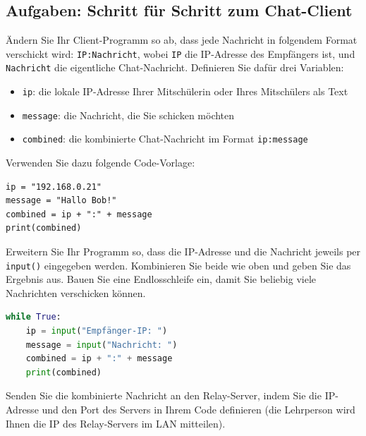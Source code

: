 \subsection{Aufgaben: Schritt für Schritt zum Chat-Client}

\begin{myexercise}
    Ändern Sie Ihr Client-Programm so ab, dass jede Nachricht in folgendem Format verschickt wird: \texttt{IP:Nachricht}, wobei \texttt{IP} die \gls{IP}-Adresse des Empfängers ist, und \texttt{Nachricht} die eigentliche Chat-Nachricht. Definieren Sie dafür drei Variablen:
    \begin{itemize}
        \item \texttt{ip}: die lokale \gls{IP}-Adresse Ihrer Mitschülerin oder Ihres Mitschülers als Text
        \item \texttt{message}: die Nachricht, die Sie schicken möchten
        \item \texttt{combined}: die kombinierte Chat-Nachricht im Format \texttt{ip:message}
    \end{itemize}
    Verwenden Sie dazu folgende Code-Vorlage:
    \begin{lstlisting}
ip = "192.168.0.21"
message = "Hallo Bob!"
combined = ip + ":" + message
print(combined)
\end{lstlisting}
\end{myexercise}

\begin{myexercise}

    Erweitern Sie Ihr Programm so, dass die \gls{IP}-Adresse und die Nachricht jeweils per \texttt{input()} eingegeben werden. Kombinieren Sie beide wie oben und geben Sie das Ergebnis aus. Bauen Sie eine Endlosschleife ein, damit Sie beliebig viele Nachrichten verschicken können.
    \begin{myanswer}
        \begin{lstlisting}[language=Python]
while True:
    ip = input("Empfänger-IP: ")
    message = input("Nachricht: ")
    combined = ip + ":" + message
    print(combined)
\end{lstlisting}
    \end{myanswer}
\end{myexercise}

\begin{myexercise}
    Senden Sie die kombinierte Nachricht an den Relay-Server, indem Sie die \gls{IP}-Adresse und den Port des Servers in Ihrem Code definieren (die Lehrperson wird Ihnen die \gls{IP} des Relay-Servers im \gls{LAN} mitteilen).
\end{myexercise}


